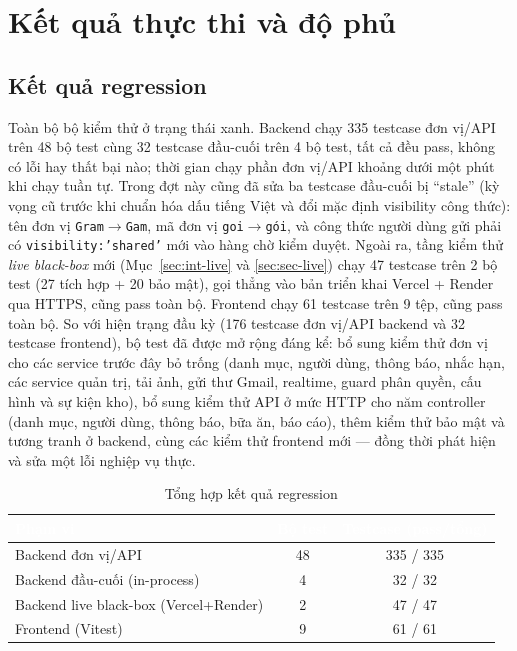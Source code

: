 \documentclass[12pt,a4paper]{article}
\newcommand{\code}[1]{\texttt{#1}}
\newcommand{\thead}[1]{\textbf{\textcolor{white}{#1}}}
\begin{document}
\section{Kết quả thực thi và độ phủ}

\subsection{Kết quả regression}

Toàn bộ bộ kiểm thử ở trạng thái xanh. Backend chạy 335 testcase đơn vị/API trên 48 bộ test cùng 32 testcase
đầu-cuối trên 4 bộ test, tất cả đều pass, không có lỗi hay thất bại nào; thời gian chạy phần đơn vị/API
khoảng dưới một phút khi chạy tuần tự. Trong đợt này cũng đã sửa ba testcase đầu-cuối bị ``stale'' (kỳ vọng cũ trước khi chuẩn hóa
dấu tiếng Việt và đổi mặc định visibility công thức): tên đơn vị \code{Gram$\to$Gam}, mã đơn vị
\code{goi$\to$gói}, và công thức người dùng gửi phải có \code{visibility:'shared'} mới vào hàng chờ kiểm
duyệt. Ngoài ra, tầng kiểm thử \emph{live black-box} mới (Mục~\ref{sec:int-live} và \ref{sec:sec-live}) chạy
47 testcase trên 2 bộ test (27 tích hợp + 20 bảo mật), gọi thẳng vào bản triển khai Vercel + Render qua HTTPS,
cũng pass toàn bộ. Frontend chạy
61 testcase trên 9 tệp, cũng pass toàn bộ. So với hiện trạng đầu kỳ (176
testcase đơn vị/API backend và 32 testcase frontend), bộ test đã được mở rộng đáng kể: bổ sung kiểm thử đơn
vị cho các service trước đây bỏ trống (danh mục, người dùng, thông báo, nhắc hạn, các service quản trị,
tải ảnh, gửi thư Gmail, realtime, guard phân quyền, cấu hình và sự kiện kho), bổ
sung kiểm thử API ở mức HTTP cho năm controller (danh mục, người dùng, thông báo, bữa ăn, báo cáo), thêm
kiểm thử bảo mật và tương tranh ở backend, cùng các kiểm thử frontend mới --- đồng thời phát hiện và sửa một
lỗi nghiệp vụ thực.

\begin{table}[h]
\centering
\caption{Tổng hợp kết quả regression}
\label{tab:results}
\begin{tabularx}{\linewidth}{|Y|c|c|}
\hline
{}
\thead{Phạm vi} & \thead{Bộ test} & \thead{Testcase (pass/tổng)} \\
\hline
Backend đơn vị/API & 48 & 335 / 335 \\
\hline
Backend đầu-cuối (in-process) & 4 & 32 / 32 \\
\hline
Backend live black-box (Vercel+Render) & 2 & 47 / 47 \\
\hline
Frontend (Vitest) & 9 & 61 / 61 \\
\hline
\end{tabularx}
\end{table}
\end{document}
